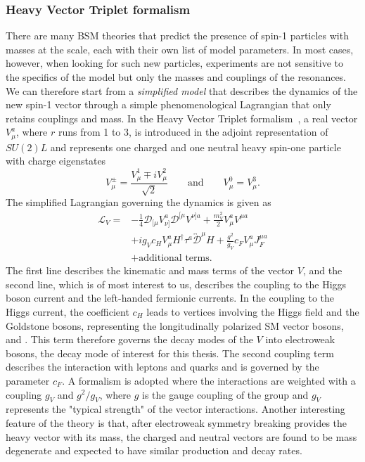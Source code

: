 \subsubsection{Heavy Vector Triplet formalism}
\label{sec:theory:hvt}
There are many BSM theories that predict the presence of spin-1 particles with masses at the \TeV scale, each with their own list of model parameters. In most cases, however, when looking for such new particles, experiments are not sensitive to the specifics of the model but only the masses and couplings of the resonances. We can therefore start from a \emph{simplified model} that describes the dynamics of the new spin-1 vector through a simple phenomenological Lagrangian that only retains couplings and mass. In the Heavy Vector Triplet formalism~\cite{Pappadopulo:2014qza}, a real vector $V_{\mu}^a$, where $r$ runs from 1 to 3, is introduced in the adjoint representation of $SU(2)L$ and represents one charged
and one neutral heavy spin-one particle with charge eigenstates
\begin{equation}\label{eqn:HVT_1}
V^\pm_\mu = \frac{V^1_\mu \mp iV^2_\mu}{\sqrt{2}} \qquad \textrm{and}\qquad V^0_\mu = V^3_\mu.
\end{equation}
The simplified Lagrangian governing the dynamics is given as
\begin{equation}
\begin{split}
\mathcal{L}_V = & -\frac{1}{4}\mathcal{D}_{[\mu}V^a_{\nu]}\mathcal{D}^{[\mu}V^{\nu]a} + \frac{m^2_V}{2}V^a_\mu V^{\mu a}\\
 & + ig_Vc_HV^a_\mu H^\dag\tau^a\overleftrightarrow{\mathcal{D}}^\mu H + \frac{g^2}{g_V}c_FV^a_\mu J^{\mu a}_F\\
 & + \mbox{additional terms.}
 \end{split}
\end{equation}
The first line describes the kinematic and mass terms of the vector $V$, and the second line, which is of most interest to us, describes the coupling to the Higgs boson current and the left-handed fermionic currents.
In the coupling to the Higgs current, the coefficient $c_H$ leads to vertices involving the Higgs field and the Goldstone bosons, representing the longitudinally polarized SM vector bosons, \PW and \PZ.
This term therefore governs the decay modes of the $V$ into electroweak bosons, the decay mode of interest for this thesis. The second coupling term describes the interaction with leptons and quarks and is governed by the parameter $c_F$. A formalism is adopted where the interactions are weighted with a coupling $g_V$ and $g^2/g_V$, where $g$ is the gauge coupling of the group and $g_V$ represents the "typical strength" of the vector interactions. Another interesting feature of the theory is that, after electroweak symmetry breaking provides the heavy vector with its mass, the charged and neutral vectors are found to be mass degenerate and expected to have similar production and decay rates.\newline
